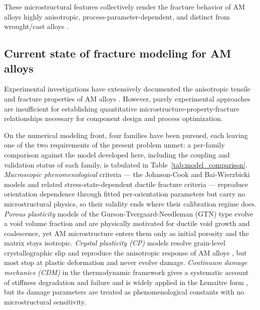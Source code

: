 These microstructural features collectively render the fracture behavior of AM alloys highly anisotropic, process-parameter-dependent, and distinct from wrought/cast alloys \cite{carroll2015anisotropic,kok2018anisotropy}.

\subsection{Current state of fracture modeling for AM alloys}

Experimental investigations have extensively documented the anisotropic tensile and fracture properties of AM alloys \cite{simonelli2014formation,leuders2013mechanical,wen2019damage}. However, purely experimental approaches are insufficient for establishing quantitative microstructure-property-fracture relationships necessary for component design and process optimization.

On the numerical modeling front, four families have been pursued, each leaving one of the two requirements of the present problem unmet: a per-family comparison against the model developed here, including the coupling and validation status of each family, is tabulated in Table~\ref{tab:model_comparison}. \textit{Macroscopic phenomenological} criteria --- the Johnson-Cook \cite{johnson1985fracture} and Bai-Wierzbicki \cite{bai2008new} models and related stress-state-dependent ductile fracture criteria \cite{shang2018ductile} --- reproduce orientation dependence through fitted per-orientation parameters but carry no microstructural physics, so their validity ends where their calibration regime does. \textit{Porous plasticity} models of the Gurson-Tvergaard-Needleman (GTN) type \cite{gurson1977continuum,tvergaard1984analysis} evolve a void volume fraction and are physically motivated for ductile void growth and coalescence, yet AM microstructure enters them only as initial porosity and the matrix stays isotropic. \textit{Crystal plasticity (CP)} models resolve grain-level crystallographic slip and reproduce the anisotropic response of AM alloys \cite{zhang2018crystal,liu2020crystal,kapoor2021modeling}, but most stop at plastic deformation and never evolve damage. \textit{Continuum damage mechanics (CDM)} in the thermodynamic framework \cite{lemaitre1992course,chaboche1988continuum} gives a systematic account of stiffness degradation and failure and is widely applied in the Lemaitre form \cite{lemaitre1985continuous}, but its damage parameters are treated as phenomenological constants with no microstructural sensitivity.

